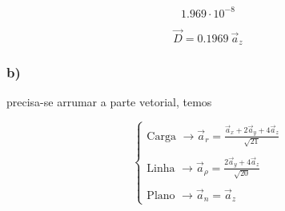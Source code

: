\documentclass[11pt]{article}
\newcommand{\prompt}[4]{
        {\ttfamily\llap{{\color{#2}[#3]:\hspace{3pt}#4}}\vspace{-\baselineskip}}
    }
\begin{document}
            
\prompt{Out}{outcolor}{11}{}
    
    $$\displaystyle 1.969 \cdot 10^{-8}$$

    

    \[ \vec{D} = 0.1969 \ \vec{a}_z \]

    \hypertarget{b}{%
\subsubsection{b)}\label{b}}

precisa-se arrumar a parte vetorial, temos


$$\begin{cases}
\text{Carga } \rightarrow  \displaystyle \vec{a}_r =  \frac{\vec{a}_x+2\vec{a}_y+4\vec{a}_z}{\sqrt{21}} \\ \\
\text{Linha }\rightarrow  \displaystyle \vec{a}_\rho = \frac{2\vec{a}_y+4\vec{a}_z}{\sqrt{20}} \\ \\
\text{Plano } \rightarrow \displaystyle \vec{a}_n = \vec{a}_z 
\end{cases}$$
\end{document}
